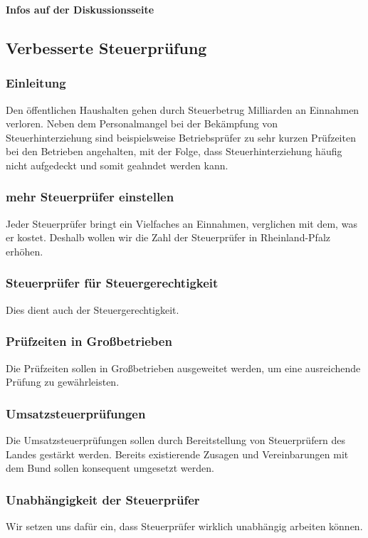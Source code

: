 \textbf{Infos auf der Diskussionsseite}

\subsection*{Verbesserte Steuerprüfung}
\label{wp:finanzen:steuerpruefung}

\subsubsection{Einleitung}
\abstimmung
Den öffentlichen Haushalten gehen durch Steuerbetrug Milliarden an Einnahmen verloren. Neben dem Personalmangel bei der Bekämpfung von Steuerhinterziehung sind beispielsweise Betriebsprüfer zu sehr kurzen Prüfzeiten bei den Betrieben angehalten, mit der Folge, dass Steuerhinterziehung häufig nicht aufgedeckt und somit geahndet werden kann.

\subsubsection{mehr Steuerprüfer einstellen}
\abstimmung
Jeder Steuerprüfer bringt ein Vielfaches an Einnahmen, verglichen mit dem, was er kostet. Deshalb wollen wir die Zahl der Steuerprüfer in Rheinland-Pfalz erhöhen.

\subsubsection{Steuerprüfer für Steuergerechtigkeit}
\abstimmung
Dies dient auch der Steuergerechtigkeit.

\subsubsection{Prüfzeiten in Großbetrieben}
\abstimmung
Die Prüfzeiten sollen in Großbetrieben ausgeweitet werden, um eine ausreichende Prüfung zu gewährleisten.

\subsubsection{Umsatzsteuerprüfungen}
\abstimmung
Die Umsatzsteuerprüfungen sollen durch Bereitstellung von Steuerprüfern des Landes gestärkt werden. Bereits existierende Zusagen und Vereinbarungen mit dem Bund sollen konsequent umgesetzt werden.

\subsubsection{Unabhängigkeit der Steuerprüfer}
\abstimmung
Wir setzen uns dafür ein, dass Steuerprüfer wirklich unabhängig arbeiten können.
 
